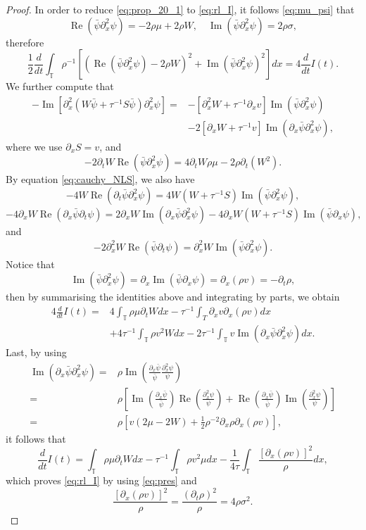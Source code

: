 \documentclass[leqno]{amsart}
\theoremstyle{plain}
\theoremstyle{definition}
\theoremstyle{remark}
\newtheorem{rem}[thm]{\protect\remarkname}
\theoremstyle{plain}
\theoremstyle{plain}
\providecommand{\remarkname}{Remark}
\def\T{{\mathbb T}}%
\def\d{{\partial}}
\DeclareMathOperator{\RE}{Re}
\DeclareMathOperator{\IM}{Im}
\numberwithin{equation}{section}
\begin{document}
\begin{proof}
In order to reduce \eqref{eq:prop_20_1} to \eqref{eq:rl_I}, it follows \eqref{eq:mu_psi} that
\[
\RE(\bar\psi\d_x^2\psi)=-2\rho\mu+2\rho W,\quad \IM(\bar\psi\d_x^2\psi)=2\rho\sigma,
\]
therefore 
\[
\frac12\frac{d}{dt}\int_\T\rho^{-1}[(\RE(\bar\psi\d_x^2\psi)-2\rho W)^2+\IM(\bar\psi\d_x^2\psi)^2]dx=4\frac{d}{dt}I(t).
\]
We further compute that
\begin{align*}
-\IM[\d_x^2(W\bar\psi+\tau^{-1}S\bar\psi)\d_x^2\psi]=&-[\d_x^2W+\tau^{-1}\d_x v]\IM(\bar\psi\d_x^2\psi)\\
&-2[\d_xW+\tau^{-1}v]\IM(\d_x\bar\psi\d_x^2\psi),
\end{align*}
where we use $\d_x S=v$, and 
\[
-2\d_t W\RE(\bar\psi\d_x^2\psi)=4\d_t W\rho\mu-2\rho\d_t (W^2).
\]
By equation \eqref{eq:cauchy_NLS}, we also have
\[
-4W\RE(\d_t\bar\psi\d_x^2\psi)=4W(W+\tau^{-1}S)\IM(\bar\psi\d_x^2\psi),
\]
\[
-4\d_x W\RE(\d_x\bar\psi\d_t\psi)=2\d_xW\IM(\d_x\bar\psi\d_x^2\psi)-4\d_xW(W+\tau^{-1}S)\IM(\bar\psi\d_x\psi),
\]
and
\[
-2\d_x^2W\RE(\bar\psi\d_t\psi)=\d_x^2W\IM(\bar\psi\d_x^2\psi).
\]
Notice that
\[
\IM(\bar\psi\d_x^2\psi)=\d_x\IM(\bar\psi\d_x\psi)=\d_x(\rho v)=-\d_t\rho,
\]
then by summarising the identities above and integrating by parts, we obtain
\begin{align*}
4\frac{d}{dt}I(t)=&4\int_\T\rho\mu\d_tWdx-\tau^{-1}\int_T\d_xv\d_x(\rho v)dx\\
&+4\tau^{-1}\int_\T \rho v^2Wdx-2\tau^{-1}\int_\T v\IM(\d_x\bar\psi\d_x^2\psi)dx.
\end{align*}
Last, by using
\begin{align*}
\IM(\d_x\bar\psi\d_x^2\psi)=&\rho\IM\left(\frac{\d_x\bar\psi}{\bar\psi}\frac{\d_x^2\psi}{\psi}\right)\\
=&\rho\left[\IM\left(\frac{\d_x\bar\psi}{\bar\psi}\right)\RE\left(\frac{\d_x^2\psi}{\psi}\right)+\RE\left(\frac{\d_x\bar\psi}{\bar\psi}\right)\IM\left(\frac{\d_x^2\psi}{\psi}\right)\right]\\
=&\rho[v(2\mu-2W)+\frac12\rho^{-2}\d_x\rho\d_x(\rho v)],
\end{align*}
it follows that
\[
\frac{d}{dt}I(t)=\int_\T\rho\mu\d_tWdx-\tau^{-1}\int_\T\rho v^2\mu dx-\frac{1}{4\tau}\int_\T \frac{[\d_x(\rho v)]^2}{\rho}dx,
\]
which proves \eqref{eq:rl_I} by using \eqref{eq:pres} and
\[
\frac{[\d_x(\rho v)]^2}{\rho}=\frac{(\d_t\rho)^2}{\rho}=4\rho\sigma^2.
\]
\end{proof}

\end{document}

